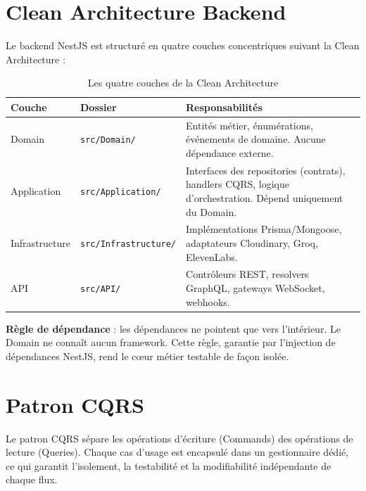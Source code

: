 ﻿\documentclass[12pt,a4paper]{report}
\begin{document}
\section{Clean Architecture Backend}

Le backend NestJS est structuré en quatre couches concentriques suivant la Clean Architecture :

\begin{table}[H]
\centering
\begin{tabularx}{\textwidth}{llX}
\toprule
\textbf{Couche} & \textbf{Dossier} & \textbf{Responsabilités} \\
\midrule
Domain & \texttt{src/Domain/} & Entités métier, énumérations, événements de domaine. Aucune dépendance externe. \\
Application & \texttt{src/Application/} & Interfaces des repositories (contrats), handlers CQRS, logique d'orchestration. Dépend uniquement du Domain. \\
Infrastructure & \texttt{src/Infrastructure/} & Implémentations Prisma/Mongoose, adaptateurs Cloudinary, Groq, ElevenLabs. \\
API & \texttt{src/API/} & Contrôleurs REST, resolvers GraphQL, gateways WebSocket, webhooks. \\
\bottomrule
\end{tabularx}
\caption{Les quatre couches de la Clean Architecture}
\end{table}

\begin{infobox}
\noindent\textbf{Règle de dépendance} : les dépendances ne pointent que vers l'intérieur. Le Domain ne connaît aucun framework. Cette règle, garantie par l'injection de dépendances NestJS, rend le cœur métier testable de façon isolée.
\end{infobox}

\section{Patron CQRS}

Le patron \ac{CQRS} sépare les opérations d'écriture (Commands) des opérations de lecture (Queries). Chaque cas d'usage est encapsulé dans un gestionnaire dédié, ce qui garantit l'isolement, la testabilité et la modifiabilité indépendante de chaque flux.
\end{document}
